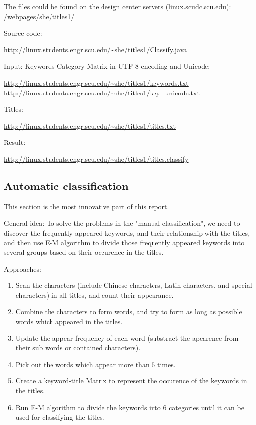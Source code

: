 \documentclass{article} %
\begin{document}
The files could be found on the design center servers (linux.scudc.scu.edu): /webpages/she/titles1/

Source code:
\begin{center}
  \url{http://linux.students.engr.scu.edu/~she/titles1/Classify.java}
\end{center}

Input:
Keywords-Category Matrix in UTF-8 encoding and Unicode:
\begin{center}
  \url{http://linux.students.engr.scu.edu/~she/titles1/keywords.txt}
  \url{http://linux.students.engr.scu.edu/~she/titles1/key_unicode.txt}
\end{center}

Titles:
\begin{center}
  \url{http://linux.students.engr.scu.edu/~she/titles1/titles.txt}
\end{center}

Result:
\begin{center}
  \url{http://linux.students.engr.scu.edu/~she/titles1/titles.classify}
\end{center}

\subsection{Automatic classification}
This section is the most innovative part of this report.

General idea: To solve the problems in the "manual classification", we need to discover the frequently appeared keywords, and their relationship with the titles, and then use E-M algorithm to divide those frequently appeared keywords into several groups based on their occurence in the titles.

Approaches:
\begin{enumerate}
\item Scan the characters (include Chinese characters, Latin characters, and special characters) in all titles, and count their appearance.
\item Combine the characters to form words, and try to form as long as possible words which appeared in the titles.
\item Update the appear frequency of each word (substract the apearence from their sub words or contained characters).
\item Pick out the words which appear more than 5 times.
\item Create a keyword-title Matrix to represent the occurence of the keywords in the titles.
\item Run E-M algorithm to divide the keywords into 6 categories until it can be used for classifying the titles.
\end{enumerate}
\end{document}
